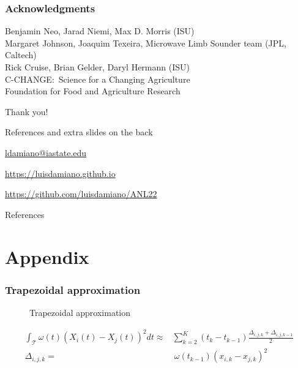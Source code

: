 \documentclass{snedecorbeamer}
\begin{document}
\begin{frame}[c]
  \frametitle{Acknowledgments}
  \centering

  {\small
    Benjamin Neo, Jarad Niemi, Max D. Morris (ISU) \\
    Margaret Johnson, Joaquim Texeira, Microwave Limb Sounder team
    (JPL, Caltech) \\
    Rick Cruise, Brian Gelder, Daryl Hermann (ISU) \\
    C-CHANGE:~Science for a Changing Agriculture \\
    Foundation for Food and Agriculture Research
  }

  \vfill

  {\huge Thank you!}

  \vfill

  {\tiny References and extra slides on the back}

  \href{ldamiano@iastate.edu}{
    ldamiano@iastate.edu}

  \href{https://luisdamiano.github.io}{
    https://luisdamiano.github.io}

  \href{https://github.com/luisdamiano/ANL22}{
    https://github.com/luisdamiano/ANL22}
\end{frame}

\begin{frame}[allowframebreaks]{References}
  \tiny
  
  
\end{frame}

\section{Appendix}
\begin{frame}
  \frametitle{Trapezoidal approximation}

  \begin{figure}[h!]
    \centering
    \caption[]{Trapezoidal approximation}
  \end{figure}

  {
    \setlength{\abovedisplayskip}{-1cm}
    \begin{align}
      \int_{\mathcal{T}}
      \omega(t)
      {\left(X_i(t) - X_j(t) \right)}^2 dt
      \approx
      &
      \sum_{k = 2}^{K} {
      \left(t_{k} - t_{k - 1}\right)
      \frac{
      \Delta_{i, j, k} +
      \Delta_{i, j, k - 1}
      }{2}
      } \\
      \Delta_{i, j, k} =
      & \
      \omega(t_{k-1}) {\left(x_{i, k} - x_{j, k}\right)}^2
    \end{align}
  }

\end{frame}
\end{document}
